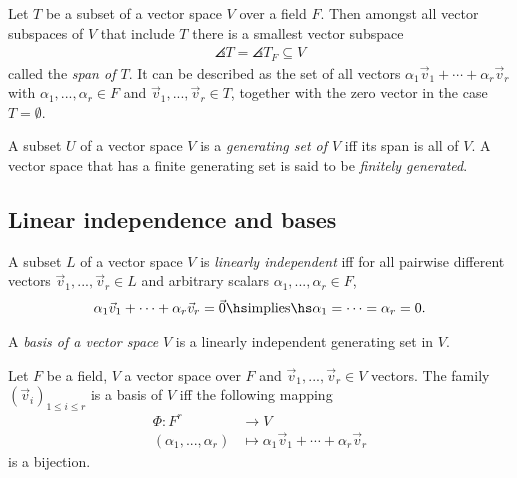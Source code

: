 \documentclass{article}
\begin{document}
\begin{proposition}[Proposition 1.4.5]
	Let $T$ be a subset of a vector space $V$ over a field $F$. Then amongst all
	vector subspaces of $V$ that include $T$ there is a smallest vector subspace
	\begin{align*}
		\angles{T} = \angles{T}_F\subseteq V
	\end{align*}
	called the \emph{span of $T$}.
	It can be described as the set of all vectors $\alpha_1\vec v_1+\cdots+\alpha_r\vec v_r$
	with $\alpha_1,...,\alpha_r\in F$ and $\vec v_1,...,\vec v_r\in T$, together
	with the zero vector in the case $T=\emptyset$.
\end{proposition}

\begin{definition}
	A subset $U$ of a vector space $V$ is a \emph{generating set of $V$}
	iff its span is all of $V$. A vector space that has a finite generating set
	is said to be \emph{finitely generated}.
\end{definition}

\subsection{Linear independence and bases}

\begin{definition}
	A subset $L$ of a vector space $V$ is \emph{linearly independent}
	iff for all pairwise different vectors $\vec v_1,...,\vec v_r\in L$ and
	arbitrary scalars $\alpha_1,...,\alpha_r\in F$,
	\begin{align*}
		\alpha_1\vec v_1+\cdots+\alpha_r\vec v_r = \vec 0
		\hs\text{implies}\hs
		\alpha_1=\cdots=\alpha_r=0.
	\end{align*}
\end{definition}

\begin{definition}
	A \emph{basis of a vector space} $V$ is a linearly independent generating
	set in $V$.
\end{definition}

\begin{theorem}[Theorem 1.5.11]
	Let $F$ be a field, $V$ a vector space over $F$ and $\vec v_1,...,\vec v_r\in V$
	vectors. The family $\left(\vec v_i\right)_{1\leq i\leq r}$ is a basis of $V$
	iff the following mapping
	\begin{align*}
		\Phi:F^r                & \to V                                                \\
		(\alpha_1,...,\alpha_r) & \mapsto \alpha_1\vec v_1 + \cdots + \alpha_r\vec v_r
	\end{align*}
	is a bijection.
\end{theorem}
\end{document}
